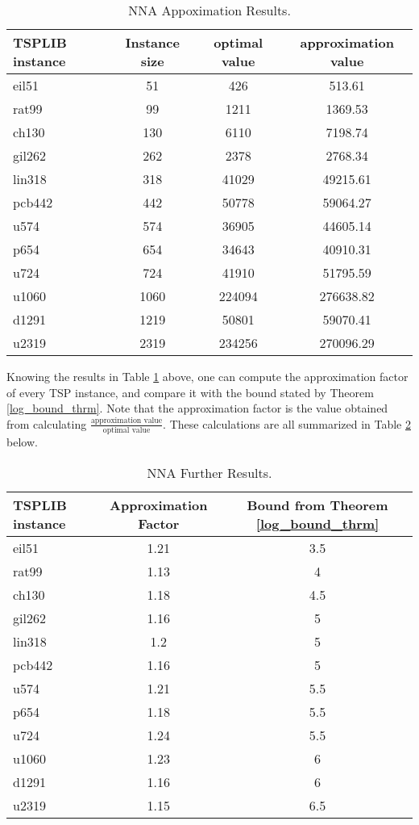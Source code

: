 \documentclass{article}
\begin{document}
\begin{table}[H]
    \caption{NNA Appoximation Results.}
    \label{tab:NNA_results}
    \begin{tabular}{l|c|c|c} %
      \textbf{TSPLIB instance} & \textbf{Instance size} & \textbf{optimal value} & \textbf{approximation value}\\
      \hline
    eil51 & 51 & 426 & 513.61\\
    rat99 & 99 & 1211 &  1369.53\\
    ch130 & 130 & 6110 & 7198.74 \\
    gil262 & 262 & 2378 & 2768.34\\
    lin318 & 318 & 41029 & 49215.61\\
    pcb442 & 442 & 50778 & 59064.27\\
    u574 & 574  & 36905 & 44605.14 \\ 
    p654 & 654 & 34643 & 40910.31\\
    u724 & 724 & 41910 & 51795.59\\
    u1060 & 1060 & 224094 & 276638.82\\
    d1291 & 1219 & 50801 & 59070.41\\
    u2319 & 2319 & 234256 & 270096.29
    \end{tabular}
\end{table}
Knowing the results in Table \ref{tab:NNA_results} above, one can compute the approximation factor of every TSP instance, and compare it with the bound stated by Theorem \ref{log_bound_thrm}. Note that the approximation factor is the value obtained from calculating $\frac{\text{approximation value}}{\text{optimal value}}$. These calculations are all summarized in Table \ref{tab:NNA_further_results} below. 
\begin{table}[H]
    \caption{NNA Further Results.}
    \label{tab:NNA_further_results}
    \begin{tabular}{l|c|c} %
      \textbf{TSPLIB instance} & \textbf{Approximation Factor} & \textbf{Bound from Theorem \ref{log_bound_thrm}}\\
      \hline
    eil51 & 1.21 & 3.5\\
    rat99 & 1.13 & 4 \\
    ch130 & 1.18  & 4.5  \\
    gil262 &1.16 &  5  \\
    lin318 & 1.2 &  5  \\
    pcb442 & 1.16  & 5  \\
    u574 & 1.21   & 5.5  \\ 
    p654 & 1.18  & 5.5 \\
    u724 & 1.24 & 5.5 \\
    u1060 & 1.23  & 6  \\
    d1291 & 1.16  & 6\\
    u2319& 1.15 & 6.5
    \end{tabular}
\end{table}
\end{document}
